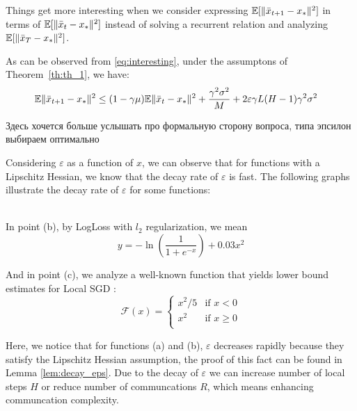 Things get more interesting when we consider expressing $\mathbb{E}[\|\bar{x}_{t+1} - x_*\|^2]$ in terms of $\mathbb{E}[\|\bar{x}_{t} - x_*\|^2]$ instead of solving a recurrent relation and analyzing $\mathbb{E}[\|\bar{x}_T - x_*\|^2]$.

\vspace{10pt}

As can be observed from \eqref{eq:interesting}, under the assumptons of Theorem~\ref{th:th_1}, we have:
\begin{align}
    \mathbb{E} \|\bar{x}_{t+1}-x_*\|^2
    &\leq
    (1 - \gamma \mu) \mathbb{E} \|\bar{x}_t - x_*\|^2 
    + \frac{\gamma^2 \sigma^2}{M}
    + 2 \varepsilon \gamma L (H-1) \gamma^2 \sigma^2 \label{eq:recurrent}
\end{align}

Здесь хочется больше услышать про формальную сторону вопроса, типа эпсилон выбираем оптимально


{\color{red}
Considering $\varepsilon$ as a function of $x$, we can observe that for functions with a Lipschitz Hessian, we know that the decay rate of $\varepsilon$ is fast. The following graphs illustrate the decay rate of $\varepsilon$ for some functions:
}


\\

In point (b), by LogLoss with $l_2$ regularization, we mean 
\begin{equation} \label{eq:logloss}
    y = -\ln\left(\frac{1}{1 + e^{-x}} \right) + 0.03 x^2
\end{equation}

And in point (c), we analyze a well-known function that yields lower bound estimates for Local SGD \citep{LowerBound}:
\begin{equation} \label{eq:piecewise}
    \mathcal{F}(x) = \begin{cases} 
      x^2 / 5 & \text{if } x < 0 \\
      x^2 & \text{if } x \geq 0 \\
   \end{cases}
\end{equation}

Here, we notice that for functions (a) and (b), $\varepsilon$ decreases rapidly because they satisfy the Lipschitz Hessian assumption, the proof of this fact can be found in Lemma \ref{lem:decay_eps}. Due to the decay of $\varepsilon$ we can increase number of local steps $H$ or reduce number of communcations $R$, which means enhancing communcation complexity.

